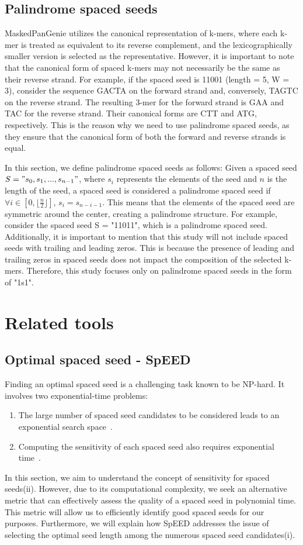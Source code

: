 \documentclass{PHlab-thesis}
\begin{document}
    
\subsection{Palindrome spaced seeds}
MaskedPanGenie utilizes the canonical representation of k-mers, where each k-mer is treated as equivalent to its reverse complement, and the lexicographically smaller version is selected as the representative. However, it is important to note that the canonical form of spaced k-mers may not necessarily be the same as their reverse strand. For example, if the spaced seed is 11001 (length = 5, W = 3), consider the sequence GACTA on the forward strand and, conversely, TAGTC on the reverse strand. The resulting 3-mer for the forward strand is GAA and TAC for the reverse strand. Their canonical forms are CTT and ATG, respectively. This is the reason why we need to use palindrome spaced seeds, as they ensure that the canonical form of both the forward and reverse strands is equal.

In this section, we define palindrome spaced seeds as follows:
Given a spaced seed $S = "s_0, s_1, ..., s_{n-1}"$, where $s_i$ represents the elements of the seed and $n$ is the length of the seed, a spaced seed is considered a palindrome spaced seed if $\forall i \in [0, \lfloor \frac{n}{2} \rfloor]$, $s_i = s_{n-i-1}$. This means that the elements of the spaced seed are symmetric around the center, creating a palindrome structure. For example, consider the spaced seed S = "11011", which is a palindrome spaced seed.
Additionally, it is important to mention that this study will not include spaced seeds with trailing and leading zeros. This is because the presence of leading and trailing zeros in spaced seeds does not impact the composition of the selected k-mers. Therefore, this study focuses only on palindrome spaced seeds in the form of "1s1".

\section{Related tools}
\subsection{Optimal spaced seed - SpEED}
Finding an optimal spaced seed is a challenging task known to be NP-hard. It involves two exponential-time problems:
\begin{enumerate}[label=(\roman*)]
    \item The large number of spaced seed candidates to be considered leads to an exponential search space~\cite{MA2007complexitySpaced}.
    \item Computing the sensitivity of each spaced seed also requires exponential time~\cite{MA2007complexitySpaced}.
\end{enumerate}
In this section, we aim to understand the concept of sensitivity for spaced seeds(ii). However, due to its computational complexity, we seek an alternative metric that can effectively assess the quality of a spaced seed in polynomial time. This metric will allow us to efficiently identify good spaced seeds for our purposes. Furthermore, we will explain how SpEED addresses the issue of selecting the optimal seed length among the numerous spaced seed candidates(i).
\end{document}
